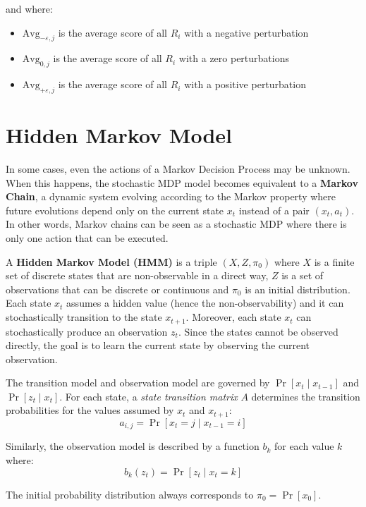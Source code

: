 \documentclass[a4paper, 12pt]{report}
\begin{document}
    and where:
    \begin{itemize}
        \item $\mathrm{Avg}_{-\varepsilon, j}$ is the average score of all $R_i$ with a negative perturbation
        \item $\mathrm{Avg}_{0, j}$ is the average score of all $R_i$ with a zero perturbations
        \item $\mathrm{Avg}_{+\varepsilon, j}$ is the average score of all $R_i$ with a positive perturbation
    \end{itemize}

    \section{Hidden Markov Model} 

    In some cases, even the actions of a Markov Decision Process may be unknown. When this happens, the stochastic MDP model becomes equivalent to a \textbf{Markov Chain}, a dynamic system evolving according to the Markov property where future evolutions depend only on the current state $x_t$ instead of a pair $(x_t,a_t)$. In other words, Markov chains can be seen as a stochastic MDP where there is only one action that can be executed.

    A \textbf{Hidden Markov Model (HMM)} is a triple $(X,Z,\pi_0)$ where $X$ is a finite set of discrete states that are non-observable in a direct way, $Z$ is a set of observations that can be discrete or continuous and $\pi_0$ is an initial distribution. Each state $x_t$ assumes a hidden value (hence the non-observability) and it can stochastically transition to the state $x_{t+1}$. Moreover, each state $x_t$ can stochastically produce an observation $z_t$. Since the states cannot be observed directly, the goal is to learn the current state by observing the current observation.
    
    The transition model and observation model are governed by $\Pr[x_t \mid x_{t-1}]$ and $\Pr[z_t \mid x_t]$. For each state, a \textit{state transition matrix} $A$ determines the transition probabilities for the values assumed by $x_t$ and $x_{t+1}$:
    \[a_{i,j} = \Pr[x_t = j \mid x_{t-1} = i]\]

    Similarly, the observation model is described by a function $b_k$ for each value $k$ where:
    \[b_k(z_t) = \Pr[z_t \mid x_t = k]\]

    The initial probability distribution always corresponds to $\pi_0 = \Pr[x_0]$.
\end{document}
